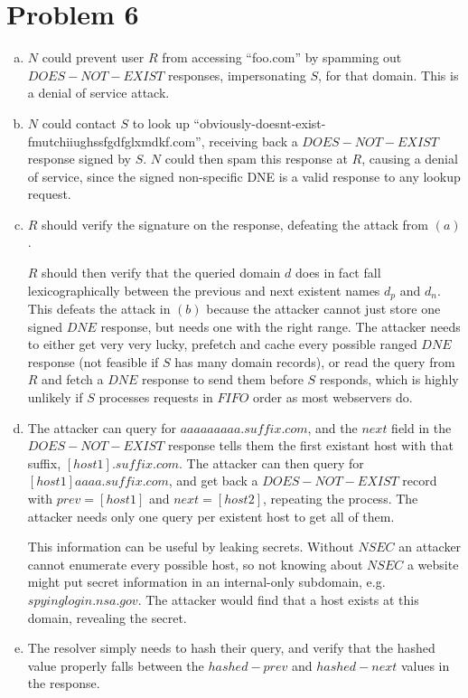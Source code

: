 \documentclass{article}
\begin{document}
\section*{Problem 6}
\begin{enumerate}[(a)]
\item $N$ could prevent user $R$ from accessing ``foo.com'' by spamming out $DOES-NOT-EXIST$ responses, impersonating $S$, for that domain. This is a denial of service attack.
\item $N$ could contact $S$ to look up ``obviously-doesnt-exist-fmutchiiughssfgdfglxmdkf.com'', receiving back a $DOES-NOT-EXIST$ response signed by $S$. $N$ could then spam this response at $R$, causing a denial of service, since the signed non-specific DNE is a valid response to any lookup request.
\item $R$ should verify the signature on the response, defeating the attack from $(a)$.

$R$ should then verify that the queried domain $d$ does in fact fall lexicographically between the previous and next existent names $d_p$ and $d_n$. This defeats the attack in $(b)$ because the attacker cannot just store one signed $DNE$ response, but needs one with the right range. The attacker needs to either get very very lucky, prefetch and cache every possible ranged $DNE$ response (not feasible if $S$ has many domain records), or read the query from $R$ and  fetch a $DNE$ response to send them before $S$ responds, which is highly unlikely if $S$ processes requests in $FIFO$ order as most webservers do.

\item The attacker can query for $aaaaaaaaa.suffix.com$, and the $next$ field in the $DOES-NOT-EXIST$ response tells them the first existant host with that suffix, $[host1].suffix.com$. The attacker can then query for $[host1]aaaa.suffix.com$, and get back a $DOES-NOT-EXIST$ record with $prev = [host1]$ and $next = [host2]$, repeating the process. The attacker needs only one query per existent host to get all of them.

This information can be useful by leaking secrets. Without $NSEC$ an attacker cannot enumerate every possible host, so not knowing about $NSEC$ a website might put secret information in an internal-only subdomain, e.g. $spyinglogin.nsa.gov$. The attacker would find that a host exists at this domain, revealing the secret.

\item The resolver simply needs to hash their query, and verify that the hashed value properly falls between the $hashed-prev$ and $hashed-next$ values in the response.
\end{enumerate}
\end{document}
